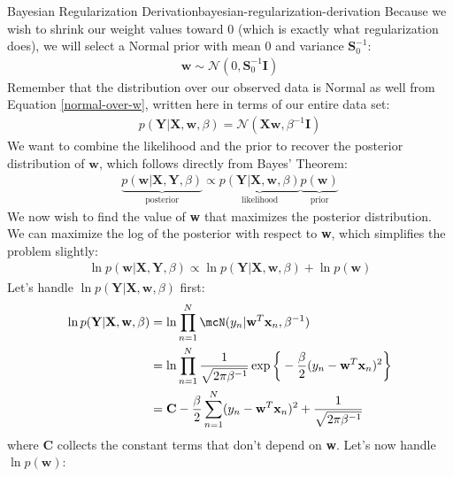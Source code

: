 \begin{derivation}{Bayesian Regularization Derivation}{bayesian-regularization-derivation}
    Because we wish to shrink our weight values toward 0 (which is exactly what regularization does), we will select a Normal prior with mean 0 and variance $\boldsymbol{S}_{0}^{-1}$:
    \begin{align*}
        \textbf{w} \sim \mathcal{N}(0, \boldsymbol{S}_{0}^{-1}\textbf{I})
    \end{align*}
    Remember that the distribution over our observed data is Normal as well from Equation \ref{normal-over-w}, written here in terms of our entire data set:
    \begin{align*}
        p(\textbf{Y} | \textbf{X}, \textbf{w}, \beta) = \mathcal{N}(\textbf{X}\textbf{w}, \beta^{-1}\textbf{I})
    \end{align*}
    We want to combine the likelihood and the prior to recover the posterior distribution of $\textbf{w}$, which follows directly from Bayes' Theorem:
    \begin{align*}
        \underbrace{p(\textbf{w}|\textbf{X},\textbf{Y}, \beta)}_{\text{posterior}} \propto \underbrace{p(\textbf{Y}| \textbf{X}, \textbf{w}, \beta)}_{\text{likelihood}}\underbrace{p(\textbf{w})}_{\text{prior}}
    \end{align*}
    We now wish to find the value of \textbf{w} that maximizes the posterior distribution. We can maximize the log of the posterior with respect to \textbf{w}, which simplifies the problem slightly:
    \begin{align*}
        \ln{p(\textbf{w}|\textbf{X},\textbf{Y}, \beta)} \propto \ln{p(\textbf{Y}| \textbf{X}, \textbf{w}, \beta)} + \ln{p(\textbf{w})}
    \end{align*}
    Let's handle $\ln{p(\textbf{Y}| \textbf{X}, \textbf{w}, \beta)}$ first:
    \begin{align*}
        \ln{p(\textbf{Y}| \textbf{X}, \textbf{w}, \beta)} &= \ln{\prod_{n=1}^{N} \mcN(y_{n} | \textbf{w}^{T} \textbf{x}_{n}, \beta^{-1})} \\
        &= \ln{\prod_{n=1}^{N} \frac{1}{\sqrt{2\pi\beta^{-1}}} \exp{\bigg\{-\frac{\beta}{2}(y_{n} - \textbf{w}^{T} \textbf{x}_{n})^2\bigg\}}} \\
        &= \textbf{C} -\frac{\beta}{2}\sum_{n=1}^{N} (y_{n} - \textbf{w}^{T} \textbf{x}_{n})^2 + \frac{1}{\sqrt{2\pi\beta^{-1}}}
    \end{align*}
    where \textbf{C} collects the constant terms that don't depend on \textbf{w}. Let's now handle $\ln{p(\textbf{w})}$:

\end{derivation}
